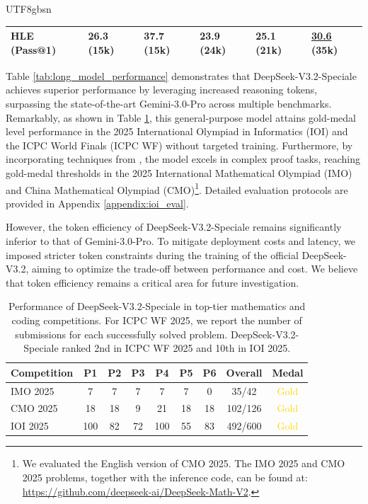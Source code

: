 \documentclass[11pt, a4paper, logo, copyright, nonumbering]{deepseek}
\def\newmodel{DeepSeek-V3.2}
\def\highmodel{DeepSeek-V3.2-Speciale}
\begin{document}
\begin{CJK*}{UTF8}{gbsn}
\begin{table}[t]
{\begin{tabular}{@{}l llll|l@{}}
        {HLE {\tiny (Pass@1)}}
        & 26.3 (15k)
        & \textbf{37.7} (15k)
        & 23.9 (24k)
        & 25.1 (21k)
        & \underline{30.6} (35k) \\
        \bottomrule
    \end{tabular}
    }
\end{table}

Table \ref{tab:long_model_performance} demonstrates that \highmodel{} achieves superior performance by leveraging increased reasoning tokens, surpassing the state-of-the-art Gemini-3.0-Pro across multiple benchmarks.
Remarkably, as shown in Table \ref{tab:imo_ioi}, this general-purpose model attains gold-medal level performance in the 2025 International Olympiad in Informatics (IOI) and the ICPC World Finals (ICPC WF) without targeted training.
Furthermore, by incorporating techniques from \citet{deepseek-math-v2}, the model excels in complex proof tasks, reaching gold-medal thresholds in the 2025 International Mathematical Olympiad (IMO) and China Mathematical Olympiad (CMO)\footnote{We evaluated the English version of CMO 2025. The IMO 2025 and CMO 2025 problems, together with the inference code, can be found at: \url{https://github.com/deepseek-ai/DeepSeek-Math-V2}.}. Detailed evaluation protocols are provided in Appendix \ref{appendix:ioi_eval}.

However, the token efficiency of \highmodel{} remains significantly inferior to that of Gemini-3.0-Pro. 
To mitigate deployment costs and latency, we imposed stricter token constraints during the training of the official \newmodel{}, aiming to optimize the trade-off between performance and cost.
We believe that token efficiency remains a critical area for future investigation.

\begin{table}[htbp]
\centering
\caption{Performance of \highmodel{} in top-tier mathematics and coding competitions.
For ICPC WF 2025, we report the number of submissions for each successfully solved problem. \highmodel{} ranked 2nd in ICPC WF 2025 and 10th in IOI 2025.
}
\label{tab:imo_ioi}

\begin{tabular}{lcccccc cc}
\toprule
\textbf{Competition} & \textbf{P1} & \textbf{P2} & \textbf{P3} & \textbf{P4} & \textbf{P5} & \textbf{P6} & \textbf{Overall} & \textbf{Medal} \\
\midrule
IMO 2025 & 7 & 7 & 7 & 7 & 7 & 0 & 35/42 & \textcolor{gold}{Gold} \\
CMO 2025 & 18 & 18 & 9 & 21 & 18 & 18 & 102/126 & \textcolor{gold}{Gold} \\
IOI 2025 & 100 & 82 & 72 & 100 & 55 & 83 & 492/600 & \textcolor{gold}{Gold} \\
\bottomrule
\end{tabular}


\end{table}
\end{CJK*}
\end{document}
